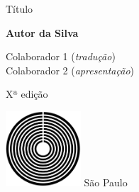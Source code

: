 




\begingroup\thispagestyle{empty}\vspace*{.05\textheight} 

              \formular
              
              \LARGE\noindent
              Título

                      

              \bigskip  
              
              \Large\noindent\textbf{Autor da Silva}

              \vfill
              {\fontsize{30}{40}%
              \small\noindent 
              Colaborador 1 (\textit{tradução})\vspace{-0.3em}\\
              \noindent
              Colaborador 2 (\textit{apresentação})}
              
              \bigskip

              \noindent
              {\fontsize{30}{40}%
              \small\noindent Xª edição}
              

              \vfill\noindent\includegraphics[width=0.21\textwidth]{logo}
              \break{} 
              \smallskip
              {\fontsize{30}{40}%
              \scriptsize\noindent{}São Paulo\quad\the\year}

\endgroup
\pagebreak
